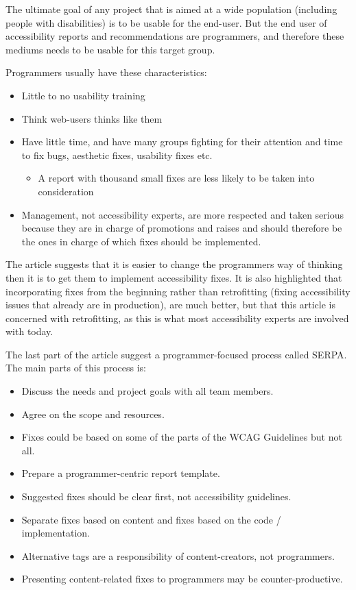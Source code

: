     The ultimate goal of any project that is aimed at a wide population (including people with disabilities) is to be usable for the end-user. But the end user of accessibility reports and recommendations are programmers, and therefore these mediums needs to be usable for this target group. 
    
    Programmers usually have these characteristics:
    \begin{itemize}
        \item Little to no usability training
        \item Think web-users thinks like them
        \item Have little time, and have many groups fighting for their attention and time to fix bugs, aesthetic fixes, usability fixes etc.
        \begin{itemize}
            \item A report with thousand small fixes are less likely to be taken into consideration
        \end{itemize}
        \item Management, not accessibility experts, are more respected and taken serious because they are in charge of promotions and raises and should therefore be the ones in charge of which fixes should be implemented.
    \end{itemize}
    
    The article suggests that it is easier to change the programmers way of thinking then it is to get them to implement accessibility fixes. It is also highlighted that incorporating fixes from the beginning rather than retrofitting (fixing accessibility issues that already are in production), are much better, but that this article is concerned with retrofitting, as this is what most accessibility experts are involved with today.
    
    The last part of the article suggest a programmer-focused process called SERPA. The main parts of this process is:
    \begin{itemize}
        \item Discuss the needs and project goals with all team members.
        \item Agree on the scope and resources.
        \item Fixes could be based on some of the parts of the WCAG Guidelines but not all.
        \item Prepare a programmer-centric report template.
        \item Suggested fixes should be clear first, not accessibility guidelines.
        \item Separate fixes based on content and fixes based on the code / implementation.
        \item Alternative tags are a responsibility of content-creators, not programmers.
        \item Presenting content-related fixes to programmers may be counter-productive.  
    \end{itemize}
    
